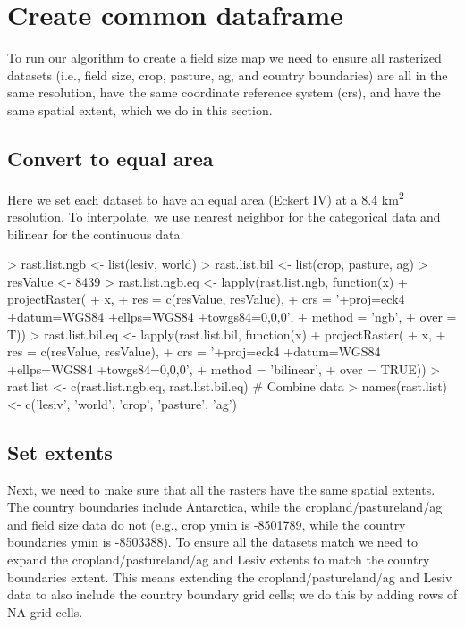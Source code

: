 \documentclass{article}
\begin{document}
\section{Create common dataframe}

To run our algorithm to create a field size map we need to ensure all rasterized datasets (i.e., field size, crop, pasture, ag, and country boundaries) are all in the same resolution, have the same coordinate reference system (crs), and have the same spatial extent, which we do in this section.

\subsection{Convert to equal area}

Here we set each dataset to have an equal area (Eckert IV) at a 8.4 km\textsuperscript{2} resolution. To interpolate, we use nearest neighbor for the categorical data and bilinear for the continuous data.

\begin{Schunk}
\begin{Sinput}
> rast.list.ngb <- list(lesiv, world)
> rast.list.bil <- list(crop, pasture, ag)
> resValue <- 8439
> rast.list.ngb.eq <- lapply(rast.list.ngb, function(x)
+   projectRaster(
+     x,
+     res    = c(resValue, resValue),
+     crs    = '+proj=eck4 +datum=WGS84 +ellps=WGS84 +towgs84=0,0,0',
+     method = 'ngb',
+     over   = T))
> rast.list.bil.eq <- lapply(rast.list.bil, function(x)
+   projectRaster(
+     x, 
+     res    = c(resValue, resValue),
+     crs    = '+proj=eck4 +datum=WGS84 +ellps=WGS84 +towgs84=0,0,0',
+     method = 'bilinear',
+     over   = TRUE))
> rast.list <- c(rast.list.ngb.eq, rast.list.bil.eq)  # Combine data
> names(rast.list) <- c('lesiv', 'world', 'crop', 'pasture', 'ag')
\end{Sinput}
\end{Schunk}

\subsection{Set extents}

Next, we need to make sure that all the rasters have the same spatial extents. The country boundaries include Antarctica, while the cropland/pastureland/ag and field size data do not (e.g., crop ymin is -8501789, while the country boundaries ymin is -8503388). To ensure all the datasets match we need to expand the cropland/pastureland/ag and Lesiv extents to match the country boundaries extent. This means extending the cropland/pastureland/ag and Lesiv data to also include the country boundary grid cells; we do this by adding rows of NA grid cells.
\end{document}
